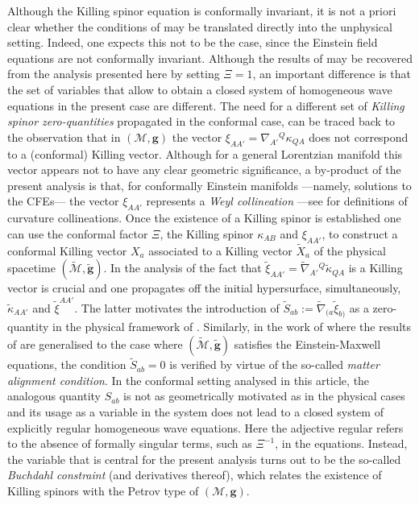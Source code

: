 \documentclass[10pt,a4paper]{article}
\theoremstyle{plain}
\def\bmg{{\bm g}}
\begin{document}
Although the Killing spinor equation is conformally invariant, it is
not a priori clear whether the conditions of \cite{GarVal08c,
  BaeVal10b} may be translated directly into the unphysical setting.
Indeed, one expects this not to be the case, since the Einstein field
equations are not conformally invariant.  Although the results of
\cite{GarVal08c} may be recovered from the analysis presented here by
setting $\Xi = 1$, an important difference is that the set of
variables that allow to obtain a closed system of homogeneous wave
equations in the present case are different. The need for a different
set of \emph{Killing spinor zero-quantities} propagated in the
conformal case, can be traced back to the observation that in
$(\mathcal{M},\bmg)$ the vector
$\xi_{AA'}=\nabla_{A'}{}^{Q}\kappa_{QA}$ does not correspond to a
(conformal) Killing vector. Although for a general Lorentzian manifold
this vector appears not to have any clear geometric significance, a
by-product of the present analysis is that, for conformally Einstein
manifolds ---namely, solutions to the CFEs---
the vector $\xi_{AA'}$ represents a \emph{Weyl
collineation} ---see \cite{KatLevDav69} for definitions of curvature
collineations.  Once the existence of a Killing spinor is established
one can use the conformal factor $\Xi$, the Killing spinor
$\kappa_{AB}$ and $\xi_{AA'}$, to construct a conformal Killing vector
$X_{a}$ associated to a Killing vector $\tilde{X}_{a}$ of the physical
spacetime $(\tilde{\mathcal{M}},\tilde{\bmg})$. In the analysis of
\cite{GarVal08c} the fact that
$\tilde{\xi}_{AA'}=\tilde{\nabla}_{A'}{}^{Q}\tilde{\kappa}_{QA}$ is a
Killing vector is crucial and one propagates off the initial
hypersurface, simultaneously, $\tilde{\kappa}_{AA'}$ and
$\tilde{\xi}^{AA'}$.  The latter motivates the introduction of
$\tilde{S}_{ab} := \tilde{\nabla}_{(a}\tilde{\xi}_{b)}$ as a
zero-quantity in the physical framework of \cite{GarVal08c}.  Similarly,
in the work of \cite{ValCol16} where the results of \cite{GarVal08c}
are generalised to the case where $(\tilde{\mathcal{M}},\tilde{\bmg})$
satisfies the Einstein-Maxwell equations, the condition
$\tilde{S}_{ab}=0$ is verified by virtue of the so-called \emph{matter
alignment condition}.  In the conformal setting analysed in this
article, the analogous quantity $S_{ab}$ is not as geometrically
motivated as in the physical cases and its usage as a variable in the
system does not lead to a closed system of explicitly regular
homogeneous wave equations. Here the adjective regular refers to the
absence of formally singular terms, such as $\Xi^{-1}$, in the
equations. Instead, the variable that is central for the present
analysis turns out to be the so-called \emph{Buchdahl constraint} (and
derivatives thereof), which relates the existence of Killing spinors
with the Petrov type of $(\mathcal{M},\bmg)$.
\end{document}
